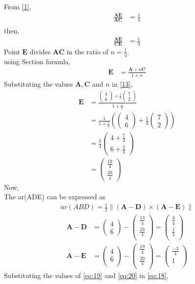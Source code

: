 \documentclass[12pt]{article}
\providecommand{\brak}[1]{\ensuremath{\left(#1\right)}}
\providecommand{\norm}[1]{\left\lVert#1\right\rVert}
\newcommand{\myvec}[1]{\ensuremath{\begin{pmatrix}#1\end{pmatrix}}}
\let\vec\mathbf
\begin{document}
\begin{enumerate}
From \eqref{1},
\begin{align}
\frac{\vec{A}\vec{E}}{\vec{A}\vec{C}} &=\frac{1}{4}\\
\end{align}
then,
\begin{align}
\frac{\vec{A}\vec{E}}{\vec{C}\vec{E}} &=\frac{1}{3}
\end{align}
Point $\vec{E}$ divides $\vec{A}\vec{C}$ in the ratio of $n = \frac{1}{3}$.\\
using Section formula,
\begin{align}
\vec{E} &=\frac{\vec{A}+n\vec{C}}{1+n}\label{13}
\end{align}
Substituting the values $\vec{A},\vec{C}$ and $n$ in \eqref{13},
\begin{align}
\vec{E} &=\frac{{\myvec{4\\6}+\frac{1}{3}\myvec{7\\2}}}{1+\frac{1}{3}}\\
	&=\frac{1}{1+\frac{1}{3}}\brak{{\myvec{4\\6}+\frac{1}{3}\myvec{7\\2}}} \\
	&=\frac{3}{4}\myvec{4+\frac{7}{3}\\6+\frac{2}{3}}\\
	&=\myvec{\frac{19}{4}\\ \frac{20}{4}}
\end{align}
Now,\\
		The ar(ADE) can be expressed as
  \begin{align}
	  ar(ABD)=\frac{1}{2} \norm{\brak{\vec{A}-\vec{D}}  \times 
   \brak{\vec{A}- \vec{E}}} \label{eq:18} 
\end{align}
\begin{align}
	\vec{A}- \vec{D} &= \myvec{4\\6}-\myvec{\frac{13}{4}\\ \frac{23}{4}\\}=\myvec{\frac{3}{4}\\ \frac{1}{4}\\}\label{eq:19}\\
	  \vec{A}- \vec{E} &= \myvec{4\\6\\}-\myvec{\frac{19}{4}\\ \frac{20}{4}\\}=\myvec{\frac{-3}{4}\\1\\}\label{eq:20}
  \end{align}
Substituting the values of \eqref{eq:19} and \eqref{eq:20} in \eqref{eq:18},

\end{enumerate}
\end{document}
